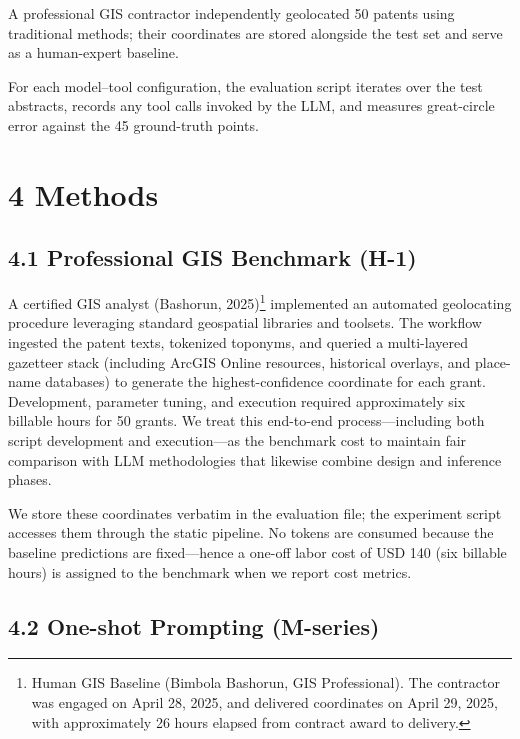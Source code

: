 \documentclass[
  11pt,
]{article}
\begin{document}
A professional GIS contractor independently geolocated 50 patents using
traditional methods; their coordinates are stored alongside the test set
and serve as a human-expert baseline.

For each model--tool configuration, the evaluation script iterates over
the test abstracts, records any tool calls invoked by the LLM, and
measures great-circle error against the 45 ground-truth points.

\section{4 Methods}\label{methods}

\subsection{4.1 Professional GIS Benchmark
(H-1)}\label{professional-gis-benchmark-h-1}

A certified GIS analyst (Bashorun, 2025)\footnote{Human GIS Baseline
  (Bimbola Bashorun, GIS Professional). The contractor was engaged on
  April 28, 2025, and delivered coordinates on April 29, 2025, with
  approximately 26 hours elapsed from contract award to delivery.}
implemented an automated geolocating procedure leveraging standard
geospatial libraries and toolsets. The workflow ingested the patent
texts, tokenized toponyms, and queried a multi-layered gazetteer stack
(including ArcGIS Online resources, historical overlays, and place-name
databases) to generate the highest-confidence coordinate for each grant.
Development, parameter tuning, and execution required approximately six
billable hours for 50 grants. We treat this end-to-end
process---including both script development and execution---as the
benchmark cost to maintain fair comparison with LLM methodologies that
likewise combine design and inference phases.

We store these coordinates verbatim in the evaluation file; the
experiment script accesses them through the static pipeline. No tokens
are consumed because the baseline predictions are fixed---hence a
one-off labor cost of USD 140 (six billable hours) is assigned to the
benchmark when we report cost metrics.

\subsection{4.2 One-shot Prompting
(M-series)}\label{one-shot-prompting-m-series}
\end{document}
